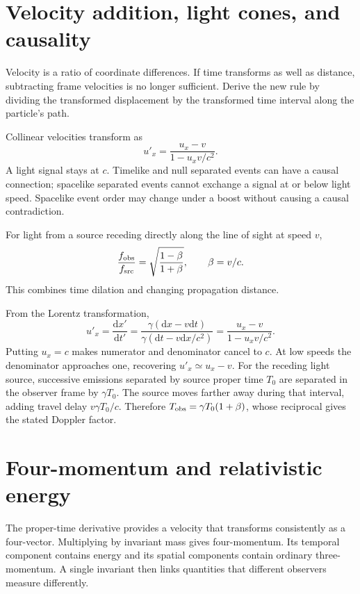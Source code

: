 \documentclass[11pt,oneside]{book}
\newcommand{\dd}{\mathrm{d}}
\theoremstyle{reviewstyle}
\begin{document}
\section{Velocity addition, light cones, and causality}
Velocity is a ratio of coordinate differences. If time transforms as well as distance, subtracting frame velocities is no longer sufficient. Derive the new rule by dividing the transformed displacement by the transformed time interval along the particle's path.

Collinear velocities transform as
\begin{equation}u'_x=\frac{u_x-v}{1-u_xv/c^2}.\end{equation}
A light signal stays at $c$. Timelike and null separated events can have a causal connection; spacelike separated events cannot exchange a signal at or below light speed. Spacelike event order may change under a boost without causing a causal contradiction.

For light from a source receding directly along the line of sight at speed $v$,
\begin{equation}\frac{f_{\rm obs}}{f_{\rm src}}=\sqrt{\frac{1-\beta}{1+\beta}},\qquad \beta=v/c.\end{equation}
This combines time dilation and changing propagation distance.

From the Lorentz transformation,
\begin{equation}
u'_x=\frac{\dd x'}{\dd t'}=
\frac{\gamma(\dd x-v\dd t)}{\gamma(\dd t-v\dd x/c^2)}
=\frac{u_x-v}{1-u_xv/c^2}.
\end{equation}
Putting $u_x=c$ makes numerator and denominator cancel to $c$. At low speeds the denominator approaches one, recovering $u'_x\simeq u_x-v$. For the receding light source, successive emissions separated by source proper time $T_0$ are separated in the observer frame by $\gamma T_0$. The source moves farther away during that interval, adding travel delay $v\gamma T_0/c$. Therefore $T_{\rm obs}=\gamma T_0(1+\beta)$, whose reciprocal gives the stated Doppler factor.

\section{Four-momentum and relativistic energy}
The proper-time derivative provides a velocity that transforms consistently as a four-vector. Multiplying by invariant mass gives four-momentum. Its temporal component contains energy and its spatial components contain ordinary three-momentum. A single invariant then links quantities that different observers measure differently.
\end{document}
